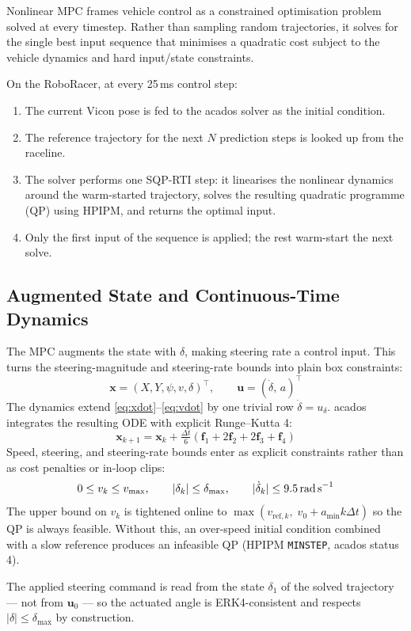 \documentclass[11pt]{article}
\begin{document}
Nonlinear MPC frames vehicle control as a constrained optimisation
problem solved at every timestep.  Rather than sampling random trajectories,
it solves for the single best input sequence that minimises a quadratic
cost subject to the vehicle dynamics and hard input/state constraints.

On the RoboRacer, at every 25\,ms control step:
\begin{enumerate}
  \item The current Vicon pose is fed to the acados solver as the initial condition.
  \item The reference trajectory for the next $N$ prediction steps is looked up from
        the raceline.
  \item The solver performs one SQP-RTI step: it linearises the nonlinear dynamics
        around the warm-started trajectory, solves the resulting quadratic programme
        (QP) using HPIPM, and returns the optimal input.
  \item Only the first input of the sequence is applied; the rest warm-start the
        next solve.
\end{enumerate}

\subsection{Augmented State and Continuous-Time Dynamics}

The MPC augments the state with $\delta$, making steering rate a control
input.  This turns the steering-magnitude and steering-rate bounds into
plain box constraints:
\[
\bm{x} = (X, Y, \psi, v, \delta)^{\!\top}, \qquad
\bm{u} = (\dot{\delta},\, a)^{\!\top}
\]
The dynamics extend \eqref{eq:xdot}--\eqref{eq:vdot} by one trivial row
$\dot{\delta} = u_\delta$.  acados integrates the resulting ODE with
explicit Runge--Kutta 4:
\[
\bm{x}_{k+1} = \bm{x}_k + \tfrac{\Delta t}{6}
  (\bm{f}_1 + 2\bm{f}_2 + 2\bm{f}_3 + \bm{f}_4)
\]
Speed, steering, and steering-rate bounds enter as explicit constraints
rather than as cost penalties or in-loop clips:
\[
0 \leq v_k \leq v_{\max}, \qquad
|\delta_k| \leq \delta_{\max}, \qquad
|\dot{\delta}_k| \leq 9.5\,\text{rad\,s}^{-1}
\]
The upper bound on $v_k$ is tightened online to
$\max(v_{\text{ref},k},\; v_0 + a_{\min} k\Delta t)$ so the QP is always
feasible.  Without this, an over-speed initial condition combined with a
slow reference produces an infeasible QP (HPIPM \texttt{MINSTEP}, acados
status 4).

The applied steering command is read from the state $\delta_1$ of the
solved trajectory --- not from $\bm{u}_0$ --- so the actuated angle is
ERK4-consistent and respects $|\delta| \leq \delta_{\max}$ by construction.
\end{document}
